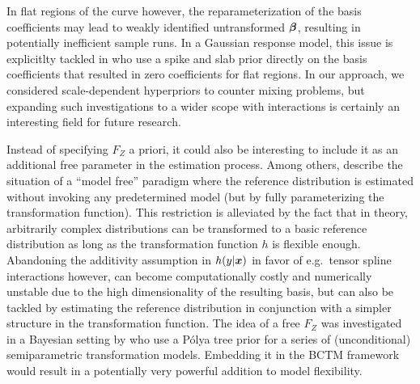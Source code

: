 \documentclass[12pt]{article}
\theoremstyle{plain}
\begin{document}
In flat regions of the curve however, the reparameterization of the basis coefficients may lead to weakly identified untransformed $\text{\boldmath$\beta$}$, resulting in potentially inefficient sample runs. In a Gaussian response model, this issue is explicitlty tackled in \cite{mckay2011variable} who use a spike and slab prior directly on the basis coefficients that resulted in zero coefficients for flat regions. In our approach, we considered scale-dependent hyperpriors to counter mixing problems, but expanding such investigations to a wider scope with interactions is certainly an interesting field for future research.


Instead of specifying $F_Z$ a priori, it could also be interesting to include it as an additional free parameter in the estimation process. Among others, \cite{linton2008,politis2013} describe the situation of a ``model free'' paradigm where the reference distribution is estimated without invoking any predetermined model (but by fully parameterizing the transformation function). This restriction is alleviated by the fact that in theory, arbitrarily complex distributions can be transformed to a basic reference distribution as long as the transformation function $h$ is flexible enough. Abandoning the additivity assumption in $h(y|\text{\boldmath$x$})$ in favor of e.g.~tensor spline interactions however, can become computationally costly and numerically unstable due to the high dimensionality of the resulting basis, but can also be tackled by estimating the reference distribution in conjunction with a simpler structure in the transformation function.  The idea of a free $F_Z$ was investigated in a Bayesian setting by \cite{walker1999bayesian,mallick2003bayesian} who use a P\'{o}lya tree prior for a series of (unconditional) semiparametric transformation models. Embedding it in the BCTM framework would result in a potentially very powerful addition to model flexibility.
\end{document}
